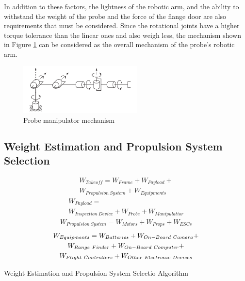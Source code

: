 \documentclass[lettersize,journal]{IEEEtran}
\begin{document}
In addition to these factors, the lightness of the robotic arm, and the ability to withstand the weight of the probe and the force of the flange door are also requirements that must be considered. Since the rotational joints have a higher torque tolerance than the linear ones and also weigh less, the mechanism shown in Figure \ref{fig.probe_mechanism} can be considered as the overall mechanism of the probe's robotic arm.

\begin{figure}[!t]
\centering
\includegraphics[width=2.45in]{./Pictures/Probe_Mechanim}
\caption{Probe manipulator mechanism ~\cite{spong2020robot}}
\label{fig.probe_mechanism}
\end{figure}

\subsection{Weight Estimation and Propulsion System Selection}

\begin{multline}\label{eq:W.Takeoff}
\text{$W_{Takeoff} = W_{Frame} + W_{Payload} + $}\\
\text{$W_{Propulsion\ System} + W_{Equipments}$}
\end{multline}
\begin{multline}\label{eq:W.Payload}
\text{$W_{Payload} = $}\\
\text{$W_{Inspection\ Device} + W_{Probe} +W_{Manipulatior}$}
\end{multline}
\begin{multline}\label{eq:W.PropulsionSystem}
\text{$W_{Propulsion\ System} = W_{Motors} + W_{Props} + W_{ESCs}$}
\end{multline}
\begin{multline}\label{eq:W.Equipments}
\text{$W_{Equipments} = W_{Batteries} + W_{On-Board\ Camera} + $}\\
\text{$W_{Range\ Finder} + W_{On-Board\ Computer} + $}\\
\text{$ W_{Flight\ Controllers} + W_{Other\ Electronic\ Devices}$}
\end{multline}

\begin{algorithm}[H]
\caption{Weight Estimation and Propulsion System Selectio Algorithm}\label{alg:WeightEst}
\begin{algorithmic}
\STATE
\STATE
\end{algorithmic}
\end{algorithm}
\end{document}
